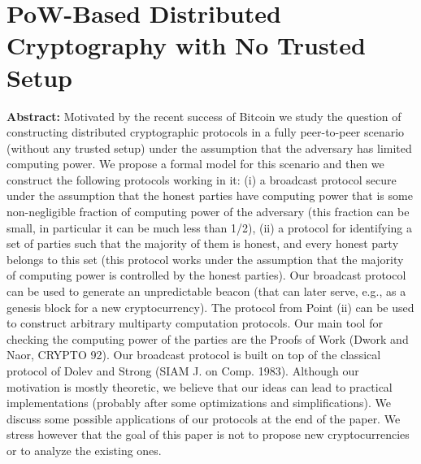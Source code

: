 \section{PoW-Based Distributed Cryptography with No Trusted Setup}

\textbf{Abstract:} 
Motivated by the recent success of Bitcoin we study the question of constructing distributed cryptographic protocols in a fully peer-to-peer scenario (without any trusted setup) under the assumption that the adversary has limited computing power. We propose a formal model for this scenario and then we construct the following protocols working in it: (i) a broadcast protocol secure under the assumption that the honest parties have computing power that is some non-negligible fraction of computing power of the adversary (this fraction can be small, in particular it can be much less than 1/2), (ii) a protocol for identifying a set of parties such that the majority of them is honest, and every honest party belongs to this set (this protocol works under the assumption that the majority of computing power is controlled by the honest parties). Our broadcast protocol can be used to generate an unpredictable beacon (that can later serve, e.g., as a genesis block for a new cryptocurrency). The protocol from Point (ii) can be used to construct arbitrary multiparty computation protocols. Our main tool for checking the computing power of the parties are the Proofs of Work (Dwork and Naor, CRYPTO 92). Our broadcast protocol is built on top of the classical protocol of Dolev and Strong (SIAM J. on Comp. 1983). Although our motivation is mostly theoretic, we believe that our ideas can lead to practical implementations (probably after some optimizations and simplifications). We discuss some possible applications of our protocols at the end of the paper. We stress however that the goal of this paper is not to propose new cryptocurrencies or to analyze the existing ones.
